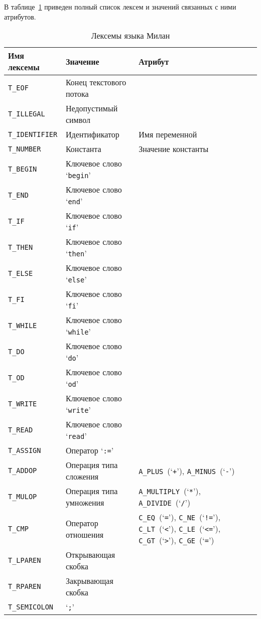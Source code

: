 \documentclass[a4paper,12pt]{article}
\begin{document}
В таблице~\ref{lexemes} приведен полный список лексем и значений связанных с ними
атрибутов.

\begin{table}
\begin{center}
\begin{tabular}{|l|l|p{6cm}|}
\hline
\hline
Имя лексемы           & Значение                & Атрибут \\
\hline
\hline
\texttt{T\_EOF}       & Конец текстового потока & \\
\hline
\texttt{T\_ILLEGAL}   & Недопустимый символ     & \\
\hline
\texttt{T\_IDENTIFIER}& Идентификатор           & Имя переменной \\
\hline
\texttt{T\_NUMBER}    & Константа               & Значение константы \\
\hline
\texttt{T\_BEGIN}     & Ключевое слово `\texttt{begin}'	& \\
\hline
\texttt{T\_END}       & Ключевое слово `\texttt{end}' 	& \\
\hline
\texttt{T\_IF}        & Ключевое слово `\texttt{if}' 	& \\
\hline
\texttt{T\_THEN}      & Ключевое слово `\texttt{then}' 	& \\
\hline
\texttt{T\_ELSE}      & Ключевое слово `\texttt{else}' 	& \\
\hline
\texttt{T\_FI}        & Ключевое слово `\texttt{fi}' 	& \\
\hline
\texttt{T\_WHILE}     & Ключевое слово `\texttt{while}'	& \\
\hline
\texttt{T\_DO}        & Ключевое слово `\texttt{do}' 	& \\
\hline
\texttt{T\_OD}        & Ключевое слово `\texttt{od}' 	& \\
\hline
\texttt{T\_WRITE}     & Ключевое слово `\texttt{write}'	& \\
\hline
\texttt{T\_READ}      & Ключевое слово `\texttt{read}' 	& \\
\hline
\texttt{T\_ASSIGN}    & Оператор `\texttt{:=}' 		& \\
\hline
\texttt{T\_ADDOP}     & Операция типа сложения 	&
\texttt{A\_PLUS}~(`\texttt{+}'), \texttt{A\_MINUS}~(`\texttt{-}') \\
\hline
\texttt{T\_MULOP}     & Операция типа умножения &
\texttt{A\_MULTIPLY}~(`\texttt{*}'), \texttt{A\_DIVIDE}~(`\texttt{/}') \\
\hline
\texttt{T\_CMP}       & Оператор отношения 	& 
\texttt{C\_EQ}~(`\texttt{=}'), \texttt{C\_NE}~(`\texttt{!=}'),
\texttt{C\_LT}~(`\texttt{<}'), \texttt{C\_LE}~(`\texttt{<=}'),
\texttt{C\_GT}~(`\texttt{>}'), \texttt{C\_GE}~(`\texttt{=}') \\
\hline
\texttt{T\_LPAREN}    & Открывающая скобка 	& \\
\hline
\texttt{T\_RPAREN}    & Закрывающая скобка 	& \\
\hline
\texttt{T\_SEMICOLON} & `\texttt{;}'    	& \\
\hline
\hline
\end{tabular}
\end{center}
\caption{Лексемы языка Милан}
\label{lexemes}
\end{table}
\end{document}
